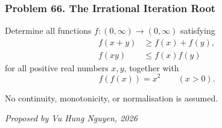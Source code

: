 \subsubsection*{Problem 66. The Irrational Iteration Root}

\begin{exercisebox}[hard]

Determine all functions $f:(0,\infty)\to(0,\infty)$ satisfying
\[
\boxed{
\begin{aligned}
f(x+y)&\ge f(x)+f(y),\\
f(xy)&\le f(x)f(y)
\end{aligned}}
\]
for all positive real numbers $x,y$, together with
\[
\boxed{\qquad f(f(x))=x^2\qquad(x>0).\qquad}
\]

No continuity, monotonicity, or normalisation is assumed.

\begin{flushright}
\textit{Proposed by Vu Hung Nguyen, 2026}
\end{flushright}


\end{exercisebox}
